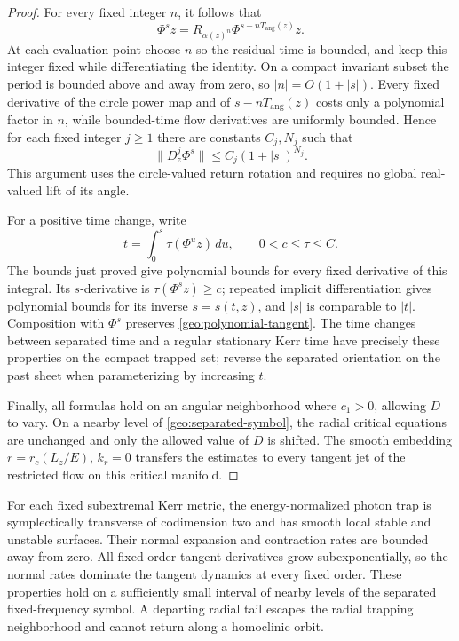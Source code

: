 \begin{proof}
For every fixed integer $n$, it follows that
\begin{equation}
 \Phi^s z=R_{\alpha(z)^n}
            \Phi^{s-nT_{\mathrm{ang}}(z)}z.
 \label{geo:angular-iterate}
\end{equation}
At each evaluation point choose $n$ so the residual time is bounded,
and keep this integer fixed while differentiating the identity.
On a compact invariant subset the period is bounded above and away
from zero, so $|n|=O(1+|s|)$.  Every fixed derivative of the circle
power map and of $s-nT_{\mathrm{ang}}(z)$ costs only a polynomial
factor in $n$, while bounded-time flow derivatives are uniformly
bounded.  Hence for each fixed integer $j\geq1$ there are constants
$C_j,N_j$ such that
\begin{equation}
 \|D_z^j\Phi^s\|\leq C_j(1+|s|)^{N_j}.
 \label{geo:polynomial-tangent}
\end{equation}
This argument uses the circle-valued return rotation and requires
no global real-valued lift of its angle.

For a positive time change, write
\[
 t=\int_0^s\tau(\Phi^u z)\,du,\qquad 0<c\leq\tau\leq C.
\]
The bounds just proved give polynomial bounds for every fixed
derivative of this integral.  Its $s$-derivative is
$\tau(\Phi^s z)\geq c$; repeated implicit differentiation gives
polynomial bounds for its inverse $s=s(t,z)$, and $|s|$ is
comparable to $|t|$.  Composition with $\Phi^s$ preserves
\eqref{geo:polynomial-tangent}.  The time changes between separated
time and a regular stationary Kerr time have precisely these
properties on the compact trapped set; reverse the separated
orientation on the past sheet when parameterizing by increasing
$t$.

Finally, all formulas hold on an angular neighborhood where
$c_1>0$, allowing $D$ to vary.  On a nearby level of
\eqref{geo:separated-symbol}, the radial critical equations are
unchanged and only the allowed value of $D$ is shifted.  The smooth
embedding $r=r_c(L_z/E)$, $k_r=0$ transfers the estimates to every
tangent jet of the restricted flow on this critical manifold.
\end{proof}

\begin{proposition}
\label{geo:normal-hyperbolicity}
For each fixed subextremal Kerr metric, the energy-normalized photon
trap is symplectically transverse of codimension two and has smooth
local stable and unstable surfaces.  Their normal expansion and
contraction rates are bounded away from zero.  All fixed-order
tangent derivatives grow subexponentially, so the normal rates
dominate the tangent dynamics at every fixed order.  These
properties hold on a sufficiently small interval of nearby levels
of the separated fixed-frequency symbol.  A departing radial tail
escapes the radial trapping neighborhood and cannot return along a
homoclinic orbit.
\end{proposition}

